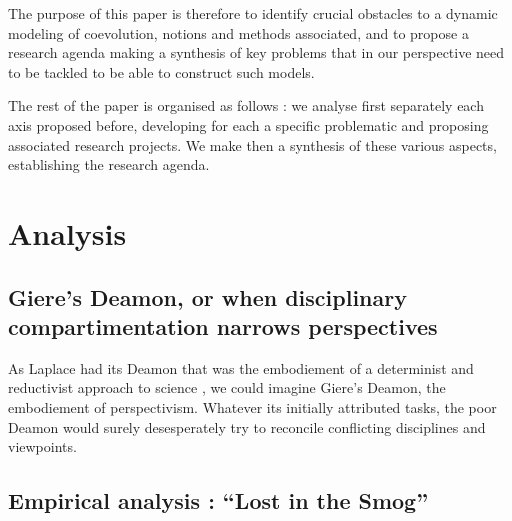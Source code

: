 

The purpose of this paper is therefore to identify crucial obstacles to a dynamic modeling of coevolution, notions and methods associated, and to propose a research agenda making a synthesis of key problems that in our perspective need to be tackled to be able to construct such models.



The rest of the paper is organised as follows : we analyse first separately each axis proposed before, developing for each a specific problematic and proposing associated research projects. We make then a synthesis of these various aspects, establishing the research agenda.



\section{Analysis}



\subsection{Giere's Deamon, or when disciplinary compartimentation narrows perspectives}




As Laplace had its Deamon that was the embodiement of a determinist and reductivist approach to science
, we could imagine Giere's Deamon, the embodiement of perspectivism. Whatever its initially attributed tasks, the poor Deamon would surely desesperately try to reconcile conflicting disciplines and viewpoints.




\subsection{Empirical analysis : ``Lost in the Smog''}

